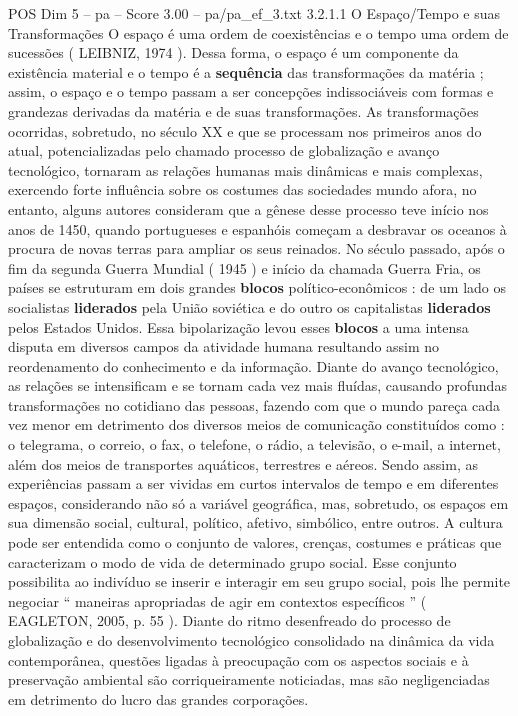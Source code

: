 \begin{textsample}{POS Dim 5 – pa – Score 3.00 – pa/pa\_ef\_3.txt}  \label{ex:f5_pos_248}
3.2.1.1 O Espaço/Tempo e suas Transformações O espaço é uma ordem de coexistências e o tempo uma ordem de sucessões ( LEIBNIZ, 1974 ).
Dessa forma, o espaço é um componente da existência material e o tempo é a \textbf{sequência} das transformações da matéria ; assim, o espaço e o tempo passam a ser concepções indissociáveis com formas e grandezas derivadas da matéria e de suas transformações.
As transformações ocorridas, sobretudo, no século XX e que se processam nos primeiros anos do atual, potencializadas pelo chamado processo de globalização e avanço tecnológico, tornaram as relações humanas mais dinâmicas e mais complexas, exercendo forte influência sobre os costumes das sociedades mundo afora, no entanto, alguns autores consideram que a gênese desse processo teve início nos anos de 1450, quando portugueses e espanhóis começam a desbravar os oceanos à procura de novas terras para ampliar os seus reinados.
No século passado, após o fim da segunda Guerra Mundial ( 1945 ) e início da chamada Guerra Fria, os países se estruturam em dois grandes \textbf{blocos} político-econômicos : de um lado os socialistas \textbf{liderados} pela União soviética e do outro os capitalistas \textbf{liderados} pelos Estados Unidos.
Essa bipolarização levou esses \textbf{blocos} a uma intensa disputa em diversos campos da atividade humana resultando assim no reordenamento do conhecimento e da informação.
Diante do avanço tecnológico, as relações se intensificam e se tornam cada vez mais fluídas, causando profundas transformações no cotidiano das pessoas, fazendo com que o mundo pareça cada vez menor em detrimento dos diversos meios de comunicação constituídos como : o telegrama, o correio, o fax, o telefone, o rádio, a televisão, o e-mail, a internet, além dos meios de transportes aquáticos, terrestres e aéreos.
Sendo assim, as experiências passam a ser vividas em curtos intervalos de tempo e em diferentes espaços, considerando não só a variável geográfica, mas, sobretudo, os espaços em sua dimensão social, cultural, político, afetivo, simbólico, entre outros.
A cultura pode ser entendida como o conjunto de valores, crenças, costumes e práticas que caracterizam o modo de vida de determinado grupo social.
Esse conjunto possibilita ao indivíduo se inserir e interagir em seu grupo social, pois lhe permite negociar “ maneiras apropriadas de agir em contextos específicos ” ( EAGLETON, 2005, p. 55 ).
Diante do ritmo desenfreado do processo de globalização e do desenvolvimento tecnológico consolidado na dinâmica da vida contemporânea, questões ligadas à preocupação com os aspectos sociais e à preservação ambiental são corriqueiramente noticiadas, mas são negligenciadas em detrimento do lucro das grandes corporações.

\end{textsample}
